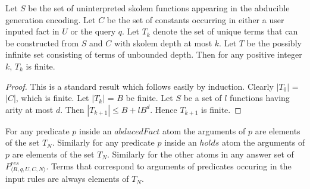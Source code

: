 \begin{lemma}
Let $S$ be the set of uninterpreted skolem functions appearing in the abducible
generation encoding. Let $C$ be the set of constants occurring in either a user
inputed fact in $U$ or the query $q$. Let $T_{k}$ denote the set of unique
terms that can be constructed from $S$ and $C$ with skolem depth at most
$k$. Let $T$  be the possibly infinite set consisting of terms of unbounded
depth. Then for any positive integer $k$, $T_{k}$ is finite.
\end{lemma}

\begin{proof}
This is a standard result which follows easily by induction. Clearly $|T_{0}|$ = $|C|$, which is finite. Let $|T_{k}|$ = $B$ be finite. Let $S$ be a set of $l$ functions having arity at most $d$. Then $|T_{k+1}|\leq B + lB^{d}$. Hence $T_{k+1}$ is finite.  
\end{proof}

\begin{lemma}
 For any predicate $p$ inside an $abducedFact$ atom the arguments of $p$ are elements of the set $T_{N}$. Similarly for any predicate $p$ inside an $holds$ atom the arguments of $p$ are elements of the set $T_{N}$. Similarly for the other atoms in any answer set of $P_{\langle R,q,U,C,N \rangle}^{res}$. Terms that correspond to arguments of predicates occuring in the input rules are always elements of $T_{N}$.
\end{lemma}

